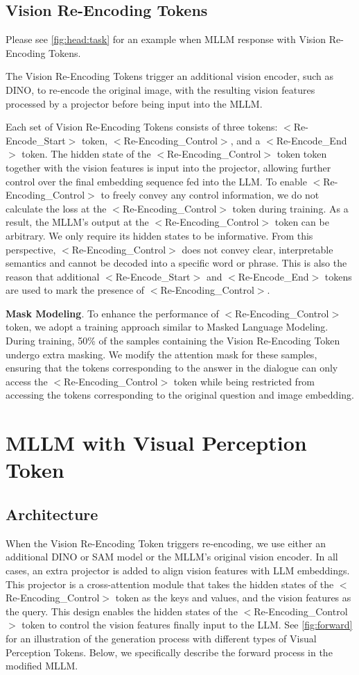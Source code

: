 \subsection{Vision Re-Encoding Tokens} 
Please see \cref{fig:head:task} for an example when MLLM response with Vision Re-Encoding Tokens. 

The Vision Re-Encoding Tokens trigger an additional vision encoder, such as DINO, to re-encode the original image, with the resulting vision features processed by a projector before being input into the MLLM. 

Each set of Vision Re-Encoding Tokens consists of three tokens: $<$Re-Encode\_Start$>$ token, $<$Re-Encoding\_Control$>$, and a $<$Re-Encode\_End$>$ token. The hidden state of the $<$Re-Encoding\_Control$>$ token token together with the vision features is input into the projector, allowing further control over the final embedding sequence fed into the LLM. 
To enable $<$Re-Encoding\_Control$>$ to freely convey any control information, we do not calculate the loss at the $<$Re-Encoding\_Control$>$ token during training. As a result, the MLLM's output at the $<$Re-Encoding\_Control$>$ token can be arbitrary. We only require its hidden states to be informative. From this perspective, $<$Re-Encoding\_Control$>$ does not convey clear, interpretable semantics and cannot be decoded into a specific word or phrase. This is also the reason that additional $<$Re-Encode\_Start$>$ and $<$Re-Encode\_End$>$ tokens are used to mark the presence of $<$Re-Encoding\_Control$>$.

\textbf{Mask Modeling}. To enhance the performance of $<$Re-Encoding\_Control$>$ token, we adopt a training approach similar to Masked Language Modeling. During training, 50\% of the samples containing the Vision Re-Encoding Token undergo extra masking.  
We modify the attention mask for these samples, ensuring that the tokens corresponding to the answer in the dialogue can only access the $<$Re-Encoding\_Control$>$ token while being restricted from accessing the tokens corresponding to the original question and image embedding.



\section{MLLM with Visual Perception Token}
\subsection{Architecture}
When the Vision Re-Encoding Token triggers re-encoding, we use either an additional DINO or SAM model or the MLLM’s original vision encoder. In all cases, an extra projector is added to align vision features with LLM embeddings. This projector is a cross-attention module that takes the hidden states of the $<$Re-Encoding\_Control$>$ token as the keys and values, and the vision features as the query. This design enables the hidden states of the $<$Re-Encoding\_Control$>$ token to control the vision features finally input to the LLM. See \cref{fig:forward} for an illustration of the generation process with different types of Visual Perception Tokens. Below, we specifically describe the forward process in the modified MLLM.

